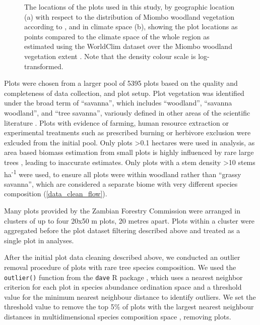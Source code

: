 \documentclass[11pt,a4paper]{article}
\begin{document}
\begin{figure}[H]
	\centering
    \qquad
{}%
\caption{The locations of the \nplots{} plots used in this study, by geographic location (a) with respect to the distribution of Miombo woodland vegetation according to \citet{White1987}, and in climate space (b), showing the plot locations as points compared to the climate space of the whole region as estimated using the WorldClim dataset over the Miombo woodland vegetation extent \citep{Fick2017}. Note that the density colour scale is log-transformed.}
\end{figure}

Plots were chosen from a larger pool of 5395 plots based on the quality and completeness of data collection, and plot setup. Plot vegetation was identified under the broad term of ``savanna'', which includes ``woodland'', ``savanna woodland'', and ``tree savanna'', variously defined in other areas of the scientific literature \citep{Ratnam2011, Hill2010}. Plots with evidence of farming, human resource extraction or experimental treatments such as prescribed burning or herbivore exclusion were exlcuded from the initial pool. Only plots >0.1 hectares were used in analysis, as area based biomass estimation from small plots is highly influenced by rare large trees \citep{Stegen2011}, leading to inaccurate estimates. Only plots with a stem density >10 stems ha\textsuperscript{-1} were used, to ensure all plots were within woodland rather than ``grassy savanna'', which are considered a separate biome with very different species composition \citep{Parr2014} (\autoref{data_clean_flow}).

Many plots provided by the Zambian Forestry Commission were arranged in clusters of up to four 20x50 m plots, 20 metres apart. Plots within a cluster were aggregated before the plot dataset filtering described above and treated as a single plot in analyses.

After the initial plot data cleaning described above, we conducted an outlier removal procedure of plots with rare tree species composition. We used the \verb|outlier()| function from the \verb|dave| R package \citep{dave}, which uses a nearest neighbor criterion for each plot in species abundance ordination space and a threshold value for the minimum nearest neighbour distance to identify outliers. We set the threshold value to remove the top 5\% of plots with the largest nearest neighbour distances in multidimensional species composition space \citep{Otto2013}, removing \noutliers{} plots.
\end{document}
